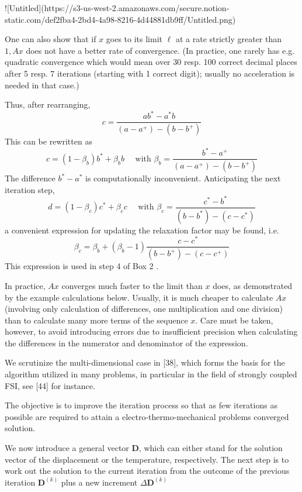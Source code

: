 ![Untitled](https://s3-us-west-2.amazonaws.com/secure.notion-static.com/def2fba4-2bd4-4a98-8216-4d44881db9ff/Untitled.png)

One can also show that if \(x\) goes to its limit \(\ell\) at a rate strictly greater than \(1, A x\) does not have a better rate of convergence. (In practice, one rarely has e.g. quadratic convergence which would mean over 30 resp. 100 correct decimal places after 5 resp. 7 iterations (starting with 1 correct digit); usually no acceleration is needed in that case.)

Thus, after rearranging,
\[
c=\frac{a b^{*}-a^{*} b}{\left(a-a^{+}\right)-\left(b-b^{+}\right)}
\]
This can be rewritten as
\[
c=\left(1-\beta_{b}\right) b^{*}+\beta_{b} b \quad \text { with } \beta_{b}=\frac{b^{*}-a^{+}}{\left(a-a^{+}\right)-\left(b-b^{+}\right)}
\]
The difference \(b^{*}-a^{*}\) is computationally inconvenient. Anticipating the next iteration step,
\[
d=\left(1-\beta_{c}\right) c^{*}+\beta_{c} c \quad \text { with } \beta_{c}=\frac{c^{*}-b^{*}}{\left(b-b^{*}\right)-\left(c-c^{*}\right)}
\]
a convenient expression for updating the relaxation factor may be found, i.e.
\[
\beta_{c}=\beta_{b}+\left(\beta_{b}-1\right) \frac{c-c^{*}}{\left(b-b^{+}\right)-\left(c-c^{+}\right)}
\]
This expression is used in step 4 of Box 2 .

In practice, \(A x\) converges much faster to the limit than \(x\) does, as demonstrated by the example calculations below. Usually, it is much cheaper to calculate \(A x\) (involving only calculation of differences, one multiplication and one division) than to calculate many more terms of the sequence \(x\). Care must be taken, however, to avoid introducing errors due to insufficient precision when calculating the differences in the numerator and denominator of the expression.

We scrutinize the multi-dimensional case in [38], which forms the basis for the algorithm utilized in many problems, in particular in the field of strongly coupled FSI, see [44] for instance.

The objective is to improve the iteration process so that as few iterations as possible are required to attain a electro-thermo-mechanical problems converged solution.

We now introduce a general vector $\mathbf{D}$, which can either stand for the solution vector of the displacement or the temperature, respectively. The next step is to work out the solution to the current iteration from the outcome of the previous iteration $\mathbf{D}^{(k)}$ plus a new increment $\Delta \mathbf{D}^{(k)}$


